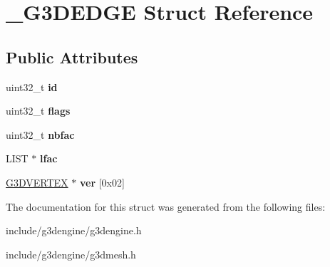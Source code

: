 \hypertarget{struct__G3DEDGE}{}\section{\+\_\+\+G3\+D\+E\+D\+GE Struct Reference}
\label{struct__G3DEDGE}
\subsection*{Public Attributes}
\begin{DoxyCompactItemize}
\item 
\mbox{\label{struct__G3DEDGE_a3ebaf5994a7115bf085f9beaeb81447d}} 
uint32\+\_\+t {\bfseries id}
\item 
\mbox{\label{struct__G3DEDGE_ac9adc22b4fb06859bdfa14abfeabd8da}} 
uint32\+\_\+t {\bfseries flags}
\item 
\mbox{\label{struct__G3DEDGE_a7e203571748930d2cef6a5209aee7b6d}} 
uint32\+\_\+t {\bfseries nbfac}
\item 
\mbox{\label{struct__G3DEDGE_a4f804dae93cb0771fa59fce6041d9ac2}} 
L\+I\+ST $\ast$ {\bfseries lfac}
\item 
\mbox{\label{struct__G3DEDGE_a83083cc7dbce2830b056290eb7ac1f50}} 
\hyperlink{struct__G3DVERTEX}{G3\+D\+V\+E\+R\+T\+EX} $\ast$ {\bfseries ver} \mbox{[}0x02\mbox{]}
\end{DoxyCompactItemize}


The documentation for this struct was generated from the following files\+:\begin{DoxyCompactItemize}
\item 
include/g3dengine/g3dengine.\+h\item 
include/g3dengine/g3dmesh.\+h\end{DoxyCompactItemize}
